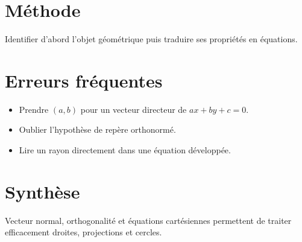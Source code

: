 \section{Méthode}
Identifier d’abord l’objet géométrique puis traduire ses propriétés en équations.

\section{Erreurs fréquentes}
\begin{itemize}
\item Prendre $(a,b)$ pour un vecteur directeur de $ax+by+c=0$.
\item Oublier l’hypothèse de repère orthonormé.
\item Lire un rayon directement dans une équation développée.
\end{itemize}

\section{Synthèse}
Vecteur normal, orthogonalité et équations cartésiennes permettent de traiter efficacement droites, projections et cercles.
